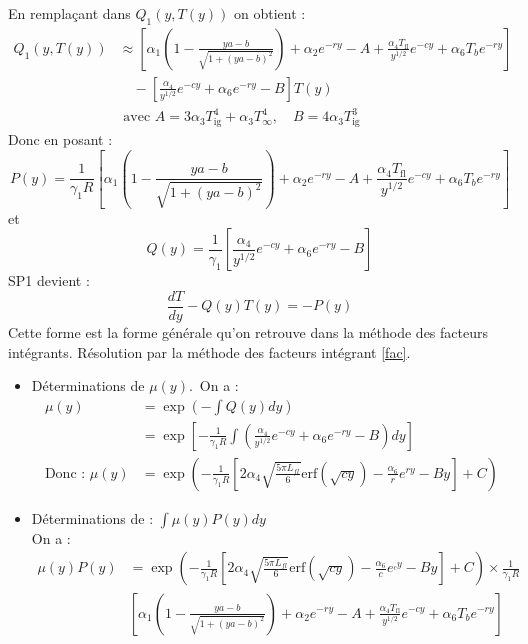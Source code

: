 \documentclass[12pt, oneside]{report} %
\theoremstyle{definition}
\theoremstyle{remark}
\begin{document}
\begin{enumerate}
	En remplaçant dans $Q_1(y, T(y))$ on obtient : 
	\begin{align*}
		Q_1(y, T(y)) &\approx \left[\alpha_1\left(1-\frac{ya-b}{\sqrt{1+(ya-b)^2}}\right) + \alpha_2 e^{-ry} - A + \frac{\alpha_4T_{\text{fl}}}{y^{1/2}}e^{-cy} + \alpha_6T_be^{-ry}\right] \\
		&\quad - \left[ \frac{\alpha_4}{y^{1/2}} e^{-cy} + \alpha_6e^{-ry} - B \right] T(y)\\
		& \text{ avec } A=  3\alpha_3 T_{\text{ig}}^4 + \alpha_3 T_\infty^4, \quad B= 4\alpha_3 T_{\text{ig}}^3
	\end{align*}
	Donc en posant : 
	\begin{equation*}
		P(y) = \frac{1}{\gamma_1 R}\left[\alpha_1\left(1-\frac{ya-b}{\sqrt{1+(ya-b)^2}}\right) + \alpha_2 e^{-ry} - A + \frac{\alpha_4T_{\text{fl}}}{y^{1/2}}e^{-cy} + \alpha_6T_be^{-ry}\right]
	\end{equation*}
	et 
	\begin{equation*}
		Q(y) = \frac{1}{\gamma_1} \left[ \frac{\alpha_4}{y^{1/2}} e^{-cy} + \alpha_6e^{-ry} - B\right]
	\end{equation*}
	SP1 devient : 
	\begin{equation}\label{fac:resolution}
		\frac{dT}{dy} - Q(y)T(y)= -P(y) 
	\end{equation}
	Cette forme est la forme générale qu'on retrouve dans la méthode des facteurs intégrants. Résolution par la méthode des facteurs intégrant \eqref{fac}. 
	\begin{itemize}
		\item Déterminations de $\mu(y)$.\
		On a : \begin{align*}
			\mu(y)& = \exp\left(-\int Q(y)dy \right)\\
			&= \exp\left[-\frac{1}{\gamma_1 R} \int \left( \frac{\alpha_4}{y^{1/2}} e^{-cy} + \alpha_6e^{-ry} - B\right)dy \right] \\
			\text{Donc : } \mu(y)&= \exp\left(-\frac{1}{\gamma_1 R} \left[2\alpha_4\sqrt{\frac{5\pi L_{fl}}{6}}\mathrm{erf}(\sqrt{cy})- \frac{\alpha_6}{r}e^{ry} - By \right] + C \right) 
		\end{align*}
		\item  Déterminations de : $\int \mu(y)P(y)dy$\\ 
		On a : \begin{align*}
			\mu(y)P(y) &= \exp\left(-\frac{1}{\gamma_1 R} \left[2\alpha_4\sqrt{\frac{5\pi L_{fl}}{6}}\mathrm{erf}(\sqrt{cy})- \frac{\alpha_6}{c}e^{_cy} - By \right] + C \right)\times\frac{1}{\gamma_1 R}\\ 
			&\left[\alpha_1\left(1-\frac{ya-b}{\sqrt{1+(ya-b)^2}}\right) + \alpha_2 e^{-ry} - A + \frac{\alpha_4T_{\text{fl}}}{y^{1/2}}e^{-cy} + \alpha_6T_be^{-ry}\right]
		\end{align*}
	\end{itemize}


\end{enumerate}
\end{document}

